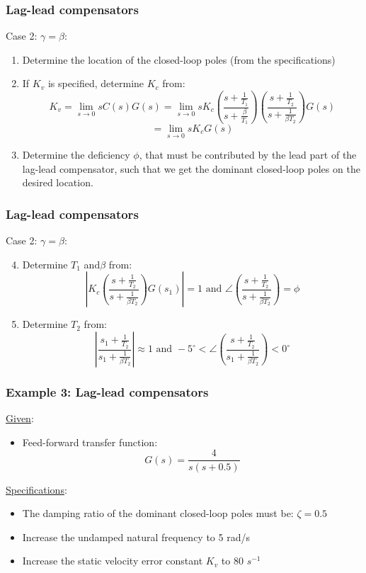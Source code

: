 \begin{frame}
	\frametitle{Lag-lead compensators}
	Case 2: $\gamma= \beta$:
	\begin{enumerate}
		\item Determine the location of the closed-loop poles (from the specifications)
		\item If $K_v$ is specified, determine $K_c$ from:\\
		$$K_v=\lim_{s \to 0} sC(s)G(s)=\lim_{s\to 0}sK_c(\frac{s+\frac{1}{T_1}}{s+\frac{\beta}{T_1}})
		(\frac{s+\frac{1}{T_2}}{s+\frac{1}{\beta T_2}})G(s)$$
		$$=\lim_{s\to0}sK_cG(s)$$\item Determine the deficiency $\phi$, that must be contributed by the lead part of the lag-lead compensator, such that we get the dominant closed-loop poles on the desired location. 
	\end{enumerate}
\end{frame}

\begin{frame}
	\frametitle{Lag-lead compensators}
	Case 2: $\gamma= \beta$:
	\begin{enumerate}
		\setcounter{enumi}{3}
		\item Determine $T_1$ and$\beta$ from:
		$$|K_c(\frac{s+\frac{1}{T_2}}{s+\frac{1}{\beta T_2}})G(s_1)|=1 \text{ and } \angle(\frac{s+\frac{1}{T_2}}{s+\frac{1}{\beta T_2}})=\phi$$
		\item Determine $T_2$ from:\\
		$$|\frac{s_1+\frac{1}{T_2}}{s_1+\frac{1}{\beta T_2}}|\approx 1 \text{ and } -5^{\circ}<\angle(\frac{s+\frac{1}{T_2}}{s_1+\frac{1}{\beta T_2}})<0^{\circ}$$
	\end{enumerate}
\end{frame}

\begin{frame}
	\frametitle{Example 3: Lag-lead compensators}
	\underline{Given}:
	\begin{itemize}
		\item Feed-forward transfer function: $$G(s)=\frac{4}{s(s+0.5)}$$
	\end{itemize}
	\underline{Specifications}:
	\begin{itemize}
		\item The damping ratio of the dominant closed-loop poles must be: $\zeta=0.5$
		\item Increase the undamped natural frequency to 5 rad/s
		\item Increase the static velocity error constant $K_v$ to 80 $s^{-1}$
	\end{itemize}
\end{frame}

